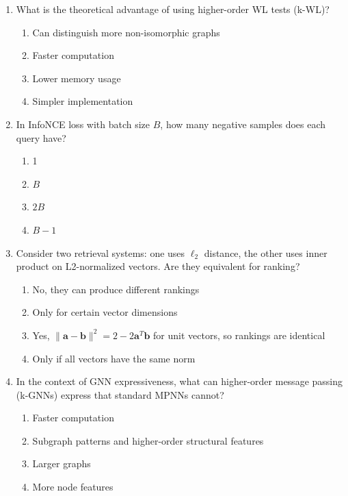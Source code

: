 \documentclass[12pt,a4paper]{article}
\begin{document}
\begin{enumerate}
\item What is the theoretical advantage of using higher-order WL tests (k-WL)?
\begin{enumerate}[label=\Alph*)]
    \item Can distinguish more non-isomorphic graphs
    \item Faster computation
    \item Lower memory usage
    \item Simpler implementation
\end{enumerate}

\item In InfoNCE loss with batch size $B$, how many negative samples does each query have?
\begin{enumerate}[label=\Alph*)]
    \item 1
    \item $B$
    \item $2B$
    \item $B-1$
\end{enumerate}

\item Consider two retrieval systems: one uses $\ell_2$ distance, the other uses inner product on L2-normalized vectors. Are they equivalent for ranking?
\begin{enumerate}[label=\Alph*)]
    \item No, they can produce different rankings
    \item Only for certain vector dimensions
    \item Yes, $\|\mathbf{a}-\mathbf{b}\|^2 = 2 - 2\mathbf{a}^T\mathbf{b}$ for unit vectors, so rankings are identical
    \item Only if all vectors have the same norm
\end{enumerate}

\item In the context of GNN expressiveness, what can higher-order message passing (k-GNNs) express that standard MPNNs cannot?
\begin{enumerate}[label=\Alph*)]
    \item Faster computation
    \item Subgraph patterns and higher-order structural features
    \item Larger graphs
    \item More node features
\end{enumerate}


\end{enumerate}
\end{document}
